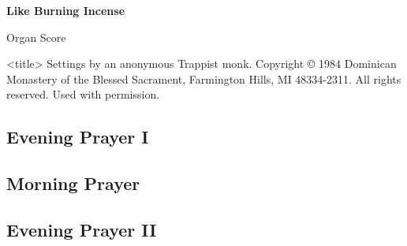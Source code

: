 \documentclass{lbi_organ_bind}
\begin{document}
\thispagestyle{empty}

\begin{center}
    \null\vfill
    \huge\bfseries
    Like Burning Incense

    \normalfont\huge
    \vspace{2\baselineskip}Organ Score

    \vspace{1\baselineskip}<title>
    \vfill\vfill\vfill
    \small
    Settings by an anonymous Trappist monk. Copyright © 1984 Dominican Monastery of the Blessed Sacrament, Farmington Hills, MI 48334-2311. All rights reserved. Used with permission.
\end{center}

\newpage



\newpage\null\newpage

\subsection{Evening Prayer I}

\newpage
{}
\subsection{Morning Prayer}

\newpage
{}
\subsection{Evening Prayer II}

\newpage
\end{document}
